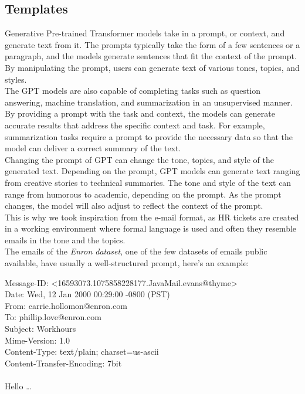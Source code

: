 \subsection*{Templates}
Generative Pre-trained Transformer\cite{radford2018improving} models take in a prompt, or context, and generate text from it. The prompts typically take the form of a few sentences or a paragraph, and the models generate sentences that fit the context of the prompt. By manipulating the prompt, users can generate text of various tones, topics, and styles. \\
The GPT models are also capable of completing tasks such as question answering, machine translation, and summarization in an unsupervised manner\cite{radford2019language}. By providing a prompt with the task and context, the models can generate accurate results that address the specific context and task. For example, summarization tasks require a prompt to provide the necessary data so that the model can deliver a correct summary of the text. \\
Changing the prompt of GPT can change the tone, topics, and style of the generated text. Depending on the prompt, GPT models can generate text ranging from creative stories to technical summaries. The tone and style of the text can range from humorous to academic, depending on the prompt. As the prompt changes, the model will also adjust to reflect the context of the prompt. \\
This is why we took inspiration from the e-mail format, as HR tickets are created in a working environment where formal language is used and often they resemble emails in the tone and the topics. \\
The emails of the \textit{Enron dataset}, one of the few datasets of emails public available, have usually a well-structured prompt, here's an example: 
\begin{adjustwidth}{1cm}{}
    Message-ID: <16593073.1075858228177.JavaMail.evans@thyme>\\
    Date: Wed, 12 Jan 2000 00:29:00 -0800 (PST) \\
    From: carrie.hollomon@enron.com\\
    To: phillip.love@enron.com\\
    Subject: Workhours\\
    Mime-Version: 1.0\\
    Content-Type: text/plain; charset=us-ascii\\
    Content-Transfer-Encoding: 7bit\\\\
    Hello \dots
\end{adjustwidth}
